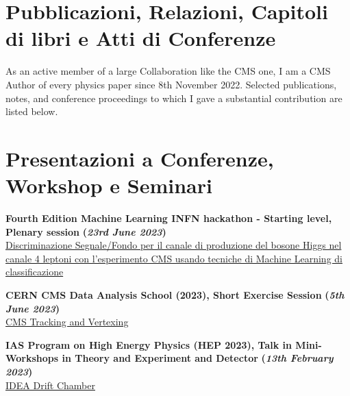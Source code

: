 \documentclass[11pt]{res}
\newcommand{\MarginText}[1]{\section{#1}\vspace{10pt}}
\begin{document}
\begin{resume}
\MarginText{Pubblicazioni, Relazioni, Capitoli di libri e Atti di Conferenze}

As an active member of a large Collaboration like the CMS one, I am a CMS Author of every physics paper since 8th November 2022. Selected publications, notes, and conference proceedings to which I gave a substantial contribution are listed below.
\nocite{*}


\vspace{10pt}
\printbibliography[heading=none,sorting=ynt]









\MarginText{Presentazioni a Conferenze, Workshop e Seminari}

\textbf{Fourth Edition Machine Learning INFN hackathon - Starting level, Plenary session} \textbf{(\textit{23rd June 2023})}\\
\href{https://agenda.infn.it/event/35607/}{Discriminazione Segnale/Fondo per il canale di produzione del bosone Higgs nel canale 4 leptoni con l'esperimento CMS usando tecniche di Machine Learning di classificazione}

\textbf{CERN CMS Data Analysis School (2023), Short Exercise Session}  \textbf{(\textit{5th June 2023})}\\
\href{https://cmstrackingpog.github.io/trackingvertexing/index.html}{CMS Tracking and Vertexing}

\textbf{IAS Program on High Energy Physics (HEP 2023), Talk in Mini-Workshops in Theory and Experiment and Detector} \textbf{(\textit{13th February 2023})}\\
\href{https://indico.cern.ch/event/1215937/}{IDEA Drift Chamber}


\end{resume}
\end{document}
